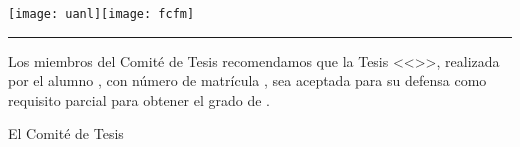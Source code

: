{\renewcommand{\baselinestretch}{1.1}\selectfont
\begin{center}\vspace*{-25mm}\hspace*{-10mm}
\begin{minipage}{170.5mm}
\hspace{-1.5mm}\texttt{[image: uanl]}\hfill{}\hbox{\texttt{[image: fcfm]}}
\hrule\vspace{0.5mm}
\scalebox{.5}{\MakeUppercase{\uanl}}\hfill\scalebox{.5}{\MakeUppercase{\fcfm}}\medskip
\end{minipage}
\end{center}

Los miembros del Comité de Tesis recomendamos que la Tesis <<\titulo>>, realizada por el alumno \autor, con número de matrícula \matricula, sea aceptada para su defensa como requisito parcial para obtener el grado de \grado\orientacion.
\ifdoctorado\vskip10mm\else\vskip8mm\fi

\begin{center}
El Comité de Tesis\\
\ifdoctorado\vskip15mm\else\vskip25mm\fi


\end{center}}
